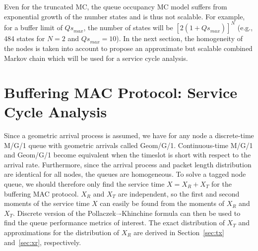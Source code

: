 \documentclass[12pt,journal,oneside,onecolumn]{IEEEtran}
\begin{document}
Even for the truncated MC, the queue occupancy MC model suffers from exponential growth of the number states 
and is  thus not scalable. For example, for a buffer limit of ${Qs}_{max}$, the number of 
states will be $[2(1+{Qs}_{max})]^N$ (e.g., 484 states for $N=2$ and ${Qs}_{max}=10$). 
In the next section, the homogeneity of the nodes is taken into account to propose an approximate but scalable combined Markov chain which will be used for a service cycle analysis.


\section{Buffering MAC Protocol: Service Cycle Analysis}
\label{sec:Service-Cycle}
 
Since a geometric arrival process is assumed, we have for any 
node a discrete-time M/G/1 queue with geometric arrivals called Geom/G/1. Continuous-time M/G/1 and Geom/G/1 become equivalent when the timeslot is short with 
respect to the arrival rate. 
Furthermore, since 
the arrival process and packet length distribution are identical for all nodes, 
the queues are homogeneous. To solve a tagged node queue, we should therefore only find 
the service time $X=X_R+X_T$ for the buffering MAC protocol. $X_R$ and $X_T$ are independent, 
so the first and second moments of the service time $X$ can easily be found from the moments of $X_R$ and $X_T$. 
Discrete version of the {Pollaczek–-Khinchine} formula \cite{takagi93-2} can then be used to find the queue performance metrics of interest.
The exact distribution of $X_T$ and approximations for the distribution of $X_R$ are derived in Section~\ref{sec:tx} and~\ref{sec:xr}, respectively. 
\end{document}
